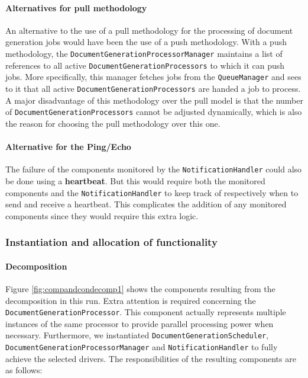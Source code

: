 \documentclass[a4paper,10pt]{article}
\begin{document}
\paragraph{Alternatives for pull methodology}
An alternative to the use of a pull methodology for the processing of document generation jobs would have been the use of a push methodology. With a push methodology, the \texttt{DocumentGenerationProcessorManager} maintains a list of references to all active \texttt{DocumentGenerationProcessors} to which it can push jobs. More specifically, this manager fetches jobs from the \texttt{QueueManager} and sees to it that all active \texttt{DocumentGenerationProcessors} are handed a job to process. A major disadvantage of this methodology over the pull model is that the number of \texttt{DocumentGenerationProcessors} cannot be adjusted dynamically, which is also the reason for choosing the pull methodology over this one.

\paragraph{Alternative for the Ping/Echo}
The failure of the components monitored by the \texttt{NotificationHandler} could also be done using a \textbf{heartbeat}. But this would require both the monitored components and the \texttt{NotificationHandler} to keep track of respectively when to send and receive a heartbeat. This complicates the addition of any monitored components since they would require this extra logic.


\subsubsection{Instantiation and allocation of functionality}
\paragraph{Decomposition}
Figure \ref{fig:compandcondecomp1} shows the components resulting from the decomposition in this run. Extra attention is required concerning the \texttt{DocumentGenerationProcessor}. This component actually represents multiple instances of the same processor to provide parallel processing power when necessary.
Furthermore, we instantiated \texttt{DocumentGenerationScheduler}, \texttt{DocumentGenerationProcessorManager} and \texttt{NotificationHandler} to fully achieve the selected drivers.
The responsibilities of the resulting components are as follows:
\end{document}

